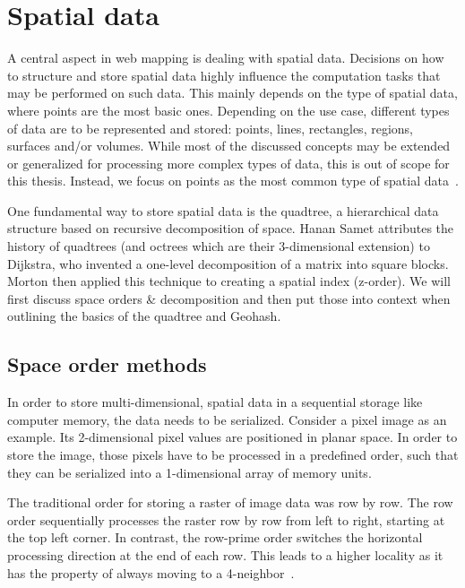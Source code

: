 
%
%

\section{Spatial data}
\label{chapter:spatial-data}

A central aspect in web mapping is dealing with spatial data. Decisions on how to structure and store spatial data highly influence the computation tasks that may be performed on such data. This mainly depends on the type of spatial data, where points are the most basic ones. Depending on the use case, different types of data are to be represented and stored: points, lines, rectangles, regions, surfaces and/or volumes. While most of the discussed concepts may be extended or generalized for processing more complex types of data, this is out of scope for this thesis. Instead, we focus on points as the most common type of spatial data~\cite{Samet90spatialdata}.

One fundamental way to store spatial data is the quadtree, a hierarchical data structure based on recursive decomposition of space. Hanan Samet attributes the history of quadtrees (and octrees which are their 3-dimensional extension) to Dijkstra, who invented a one-level decomposition of a matrix into square blocks. Morton then applied this technique to creating a spatial index (z-order). We will first discuss space orders \& decomposition and then put those into context when outlining the basics of the quadtree and Geohash.


\subsection{Space order methods}
\label{chapter:space-order}

In order to store multi-dimensional, spatial data in a sequential storage like computer memory, the data needs to be serialized. Consider a pixel image as an example. Its 2-dimensional pixel values are positioned in planar space. In order to store the image, those pixels have to be processed in a predefined order, such that they can be serialized into a 1-dimensional array of memory units.

The traditional order for storing a raster of image data was row by row. The row order sequentially processes the raster row by row from left to right, starting at the top left corner. In contrast, the row-prime order switches the horizontal processing direction at the end of each row. This leads to a higher locality as it has the property of always moving to a 4-neighbor~\cite{Goodchild83raster}.

